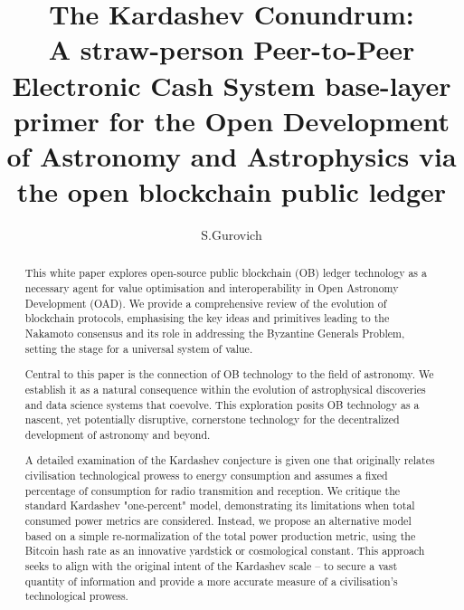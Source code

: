 \documentclass[final,5p,times,twocolumn,authoryear]{elsarticle}
\begin{document}
\begin{frontmatter}

\title{The Kardashev Conundrum:\\ A straw-person Peer-to-Peer Electronic Cash System base-layer primer for the Open Development of Astronomy and Astrophysics via the open blockchain public ledger}
 
    \author[iate,wsu]{S.Gurovich}
  
\address[iate]{
   Instituto De Astronom\'ia Te\'orica y Experimental -
   Observatorio Astron\'omico C\'ordoba (IATE--OAC--UNC--CONICET),
   Laprida 854, X5000BGR, C\'ordoba, Argentina}
\address[wsu]{
   Western Sydney University, Kingswood campus, NSW, Australia (visiting fellow 2019-2020)
}

\begin{abstract}
This white paper explores open-source public blockchain (OB) ledger technology as a necessary agent for value optimisation and interoperability in Open Astronomy Development (OAD). We provide a comprehensive review of the evolution of blockchain protocols, emphasising the key ideas and primitives leading to the Nakamoto consensus and its role in addressing the Byzantine Generals Problem, setting the stage for a universal system of value.

Central to this paper is the connection of OB technology to the field of astronomy. We establish it as a natural consequence within the evolution of astrophysical discoveries and data science systems that coevolve. This exploration posits OB technology as a nascent, yet potentially disruptive, cornerstone technology for the decentralized development of astronomy and beyond.

A detailed examination of the Kardashev conjecture is given one that originally relates civilisation technological prowess to energy consumption and assumes a fixed percentage of consumption for radio transmition and reception. We critique the standard Kardashev "one-percent" model, demonstrating its limitations when total consumed power metrics are considered. Instead, we propose an alternative model based on a simple re-normalization of the total power production metric, using the Bitcoin hash rate as an innovative yardstick or cosmological constant. This approach seeks to align with the original intent of the Kardashev scale – to secure a vast quantity of information and provide a more accurate measure of a civilisation's technological prowess.


\end{abstract}
\end{frontmatter}
\end{document}
